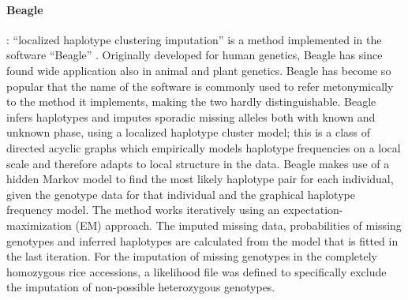 \paragraph{Beagle}
\label{par:Beagle}
: ``localized haplotype clustering imputation'' is a method implemented in the software ``Beagle'' \cite{browning_rapid_2007}. Originally developed for human genetics, Beagle has since found wide application also in animal and plant genetics. Beagle has become so popular that the name of the software is commonly used  to refer metonymically to the method it implements, making the two hardly distinguishable. Beagle infers haplotypes and imputes sporadic missing alleles both with known and unknown phase, using a localized haplotype cluster model; this is a class of directed acyclic graphs which empirically models haplotype frequencies on a local scale and therefore adapts to local structure in the data. Beagle makes use of a hidden Markov model to find the most likely haplotype pair for each individual, given the genotype data for that individual and the graphical haplotype frequency model. The method works iteratively using an expectation-maximization (EM) approach. The imputed missing data, probabilities of missing genotypes and inferred haplotypes are calculated from the model that is fitted in the last iteration. For the imputation of missing genotypes in the completely homozygous rice accessions, a likelihood file was defined to specifically exclude the imputation of non-possible heterozygous genotypes.

